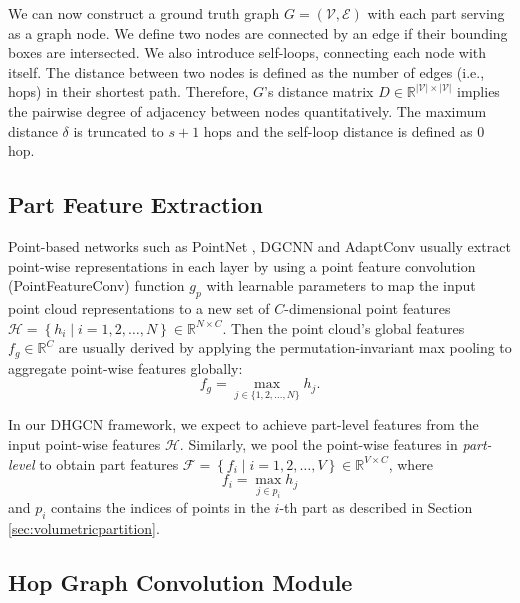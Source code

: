 \documentclass[letterpaper]{article}
\begin{document}
We can now construct a ground truth graph \(G=(\mathcal{V}, \mathcal{E})\) with each part serving as a graph node.
We define two nodes are connected by an edge if their bounding boxes are intersected.
We also introduce self-loops, connecting each node with itself.
The distance between two nodes is defined as the number of edges (i.e., hops) in their shortest path.
Therefore, \(G\)'s distance matrix \(D \in \mathbb{R}^{|\mathcal{V}| \times |\mathcal{V}|}\) implies the pairwise degree of adjacency between nodes quantitatively.
The maximum distance \(\delta\) is truncated to \(s+1\) hops and the self-loop distance is defined as 0 hop.

\subsection{Part Feature Extraction}
\label{sec:partfeatureextractor}
Point-based networks such as PointNet \cite{qi2017pointnet}, DGCNN \cite{dgcnn} and AdaptConv \cite{adaptconv} usually extract point-wise representations in each layer by using a point feature convolution (PointFeatureConv) function \(g_p\) with learnable parameters to map the input point cloud representations to a new set of \(C\)-dimensional point features \(\mathcal{H}=\left\{h_{i} \mid i=1,2, \ldots, N\right\} \in \mathbb{R}^{N \times C}\).
Then the point cloud's global features \(f_g \in \mathbb{R}^C\) are usually derived by applying the permutation-invariant max pooling to aggregate point-wise features globally:
\begin{equation}
f_{g} = \max  _{j \in  \{1,2,\dots,N\} } h_j.
\end{equation}

In our DHGCN framework, we expect to achieve part-level features from the input point-wise features \(\mathcal{H}\). %
Similarly, we pool the point-wise features in \textit{part-level} to obtain part features \(\mathcal{F}=\left\{f_{i} \mid i=1,2, \ldots, V\right\} \in \mathbb{R}^{V \times C}\), where
\begin{equation}
f_{i} = \max  _{j \in p_i} h_j
\end{equation}
and \(p_i\) contains the indices of points in the \(i\)-th part as described in Section \ref{sec:volumetricpartition}.


\subsection{Hop Graph Convolution Module}
\label{sec:dynamichopconv}
\end{document}
